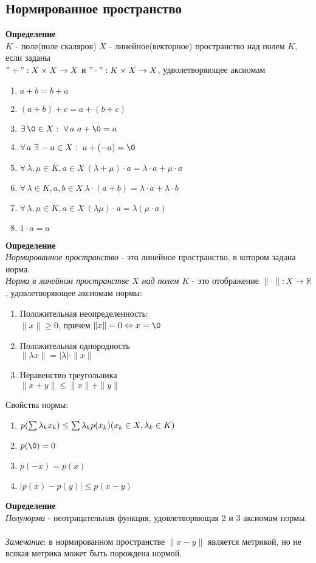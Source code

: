 \documentclass[12pt]{article}
\begin{document}
\subsection{Нормированное пространство}
\textbf{Определение}\\
$K$ - поле(поле скаляров)
$X$ - линейное(векторное) пространство над полем $K$, если заданы \\$"+": X\times X \rightarrow X$ и $"\cdot": K\times X \rightarrow X$, удволетворяющее аксиомам
\begin{enumerate}
    \item $a+b=b+a$
    \item $(a+b)+c=a+(b+c)$
    \item $\exists\,\0\in X:\ \forall\,a\ a+\0=a$
    \item $\forall\,a\ \exists\,-a\in X:\ a + (-a) = \0$
    \item $\forall\,\lambda,\mu \in K, a\in X\ (\lambda+\mu)\cdot a = \lambda\cdot a + \mu\cdot a$
    \item $\forall\,\lambda \in K, a,b\in X\ \lambda\cdot(a+b) = \lambda\cdot a + \lambda\cdot b$
    \item $\forall\,\lambda,\mu \in K, a\in X\ (\lambda\mu)\cdot a = \lambda(\mu\cdot a)$
    \item $1\cdot a = a$
\end{enumerate}
\textbf{Определение}\\
\textit{Нормированное пространство} - это линейное пространство, в котором задана норма.\\
\textit{Норма в линейном пространстве $X$ над полем $K$} - это отображение $\|\cdot\|: X \rightarrow \mathbb{R}$, удовлетворяющее аксиомам нормы:
\begin{enumerate}
    \item Положительная неопределенность:\\
    $\|x\| \geq 0$, причем $\|x\|=0 \Leftrightarrow x = \0$
    \item Положительная однородность\\
    $\|\lambda x\| = |\lambda|\cdot\|x\|$
    \item Неравенство треугольника\\
    $\|x+y\| \leq \|x\| +\|y\|$
\end{enumerate}
Свойства нормы:
\begin{enumerate}
    \item $p(\sum\lambda_kx_k) \leq \sum\lambda_k p(x_k)\\
    (x_k\in X, \lambda_k \in K)$
    \item $p(\0) = 0$
    \item $p(-x) = p(x)$
    \item $|p(x)-p(y)| \leq p(x-y)$
\end{enumerate}
\textbf{Определение}\\
\textit{Полунорма} - неотрицательная функция, удовлетворяющая 2 и 3 аксиомам нормы.\\\\
\textit{Замечание}: в нормированном пространстве $\|x-y\|$ является метрикой, но не всякая метрика может быть порождена нормой.
\end{document}
